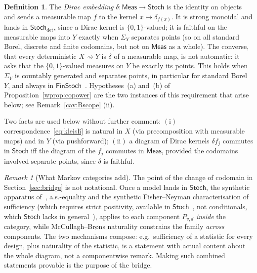 \documentclass[11pt,a4paper]{article}
\theoremstyle{plain}
\theoremstyle{definition}
\newtheorem{definition}[theorem]{Definition}
\theoremstyle{remark}
\newtheorem{remark}[theorem]{Remark}
\newcommand{\cat}[1]{\mathsf{#1}}
\newcommand{\Meas}{\cat{Meas}}
\newcommand{\Stoch}{\cat{Stoch}}
\newcommand{\FinStoch}{\cat{FinStoch}}
\newcommand{\del}{\delta}
\begin{document}
\begin{definition}\label{def:dirac}
The \emph{Dirac embedding} $\del \colon \Meas \to \Stoch$ is the identity on
objects and sends a measurable map $f$ to the kernel
$x \mapsto \delta_{f(x)}$. It is strong monoidal and lands in
$\Stoch_{\det}$, since a Dirac kernel is $\{0,1\}$-valued; it is faithful on
the measurable maps into $Y$ exactly when $\Sigma_{Y}$ separates points (so on
all standard Borel, discrete and finite codomains, but not on $\Meas$ as a
whole). The converse,
that every deterministic $X \rightsquigarrow Y$ is $\del$ of a measurable map,
is not automatic: it asks that the $\{0,1\}$-valued measures on $Y$ be
exactly its points. This holds when $\Sigma_{Y}$ is countably generated and
separates points, in particular for standard Borel $Y$, and always in
$\FinStoch$~\cite[Ex.~10.4]{fritz_synthetic_2020}. Hypotheses~(a) and~(b) of
Proposition~\ref{wprop:copower} are the two instances of this requirement that
arise below; see Remark~\ref{cav:Bscope} (ii).
\end{definition}

Two facts are used below without further comment: $(\mathrm{i})$
correspondence~\eqref{eq:kleisli} is natural in $X$ (via precomposition with
measurable maps) and in $Y$ (via pushforward); $(\mathrm{ii})$ a diagram of
Dirac kernels $\del f_{j}$ commutes in $\Stoch$ iff the diagram of the
$f_{j}$ commutes in $\Meas$, provided the codomains involved separate points,
since $\del$ is faithful.

\begin{remark}[What Markov categories add]\label{rem:whatmarkovadds}
The point of the change of codomain in Section~\ref{sec:bridge} is not
notational. Once a model lands in $\Stoch$, the synthetic apparatus
of~\cite{fritz_synthetic_2020}, a.s.-equality and the synthetic Fisher--Neyman
characterisation of sufficiency (which requires strict positivity, available in
$\Stoch$~\cite[Ex.~13.19, Thm.~14.5]{fritz_synthetic_2020}, not conditionals,
which $\Stoch$ lacks in general~\cite[Ex.~11.3]{fritz_synthetic_2020}), applies to each
component $P_{v,d}$ \emph{inside} the category, while McCullagh--Br\o ns
naturality constrains the family \emph{across} components. The two mechanisms
compose: e.g.\ sufficiency of a statistic for every design, plus naturality of
the statistic, is a statement with actual content about the whole diagram,
not a componentwise remark. Making such combined statements provable is the
purpose of the bridge.
\end{remark}
\end{document}
